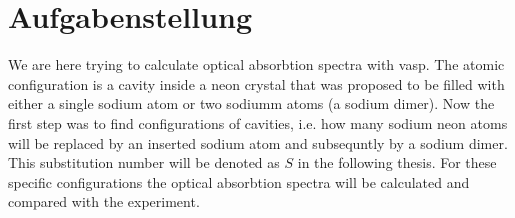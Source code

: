 \chapter{Aufgabenstellung}
\label{chap:Aufgabenstellung}
%
We are here trying to calculate optical absorbtion spectra with vasp. The atomic configuration is a cavity inside a neon crystal that was proposed to be filled with either a single sodium atom or two sodiumm atoms (a sodium dimer). Now the first step was to find configurations of cavities, i.e. how many sodium neon atoms will be replaced by an inserted sodium atom and subsequntly by a sodium dimer. This substitution number will be denoted as $S$ in the following thesis. For these specific configurations the optical absorbtion spectra will be calculated and compared with the experiment.
%
